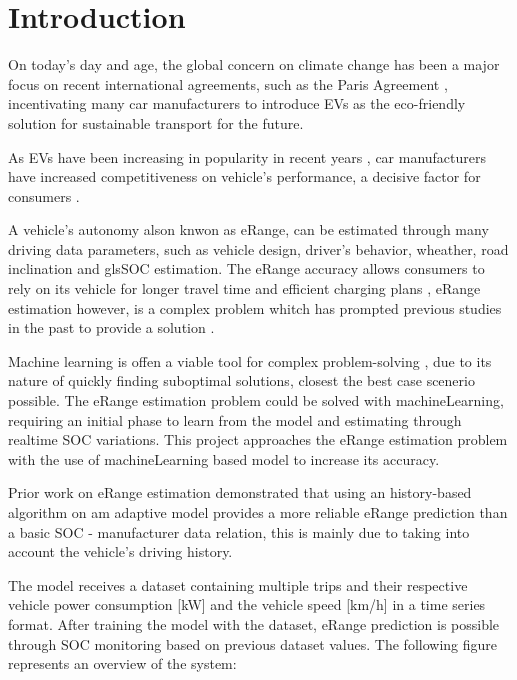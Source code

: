 \chapter{Introduction}
\label{cha:introduction}

On today's day and age, the global concern on climate
change has been a major focus on recent international agreements,
such as the Paris Agreement \cite{parisAgreement},
incentivating many car manufacturers to introduce
\gls{EVs} as the eco-friendly
solution for sustainable transport for the future.


As \gls{EVs} have been increasing in popularity in
recent years , car manufacturers have
increased competitiveness on vehicle's performance,
a decisive factor for consumers \cite{EGBUE2012717}.


A vehicle's autonomy alson knwon as \gls{eRange},
can be estimated through many driving data parameters,
such as vehicle design, driver's behavior, wheather,
road inclination and gls{SOC} estimation.
The \gls{eRange} accuracy allows consumers to rely
on its vehicle for longer travel time and efficient
charging plans , \gls{eRange} estimation
however, is a complex problem whitch has prompted
previous studies in the past to provide a solution 
\cite{classicEVX, predictionOfeRange}.

Machine learning is offen a viable tool for complex
problem-solving , due to its nature
of quickly finding suboptimal solutions,
closest the best case scenerio possible.
The \gls{eRange} estimation problem could be solved
with \gls{machineLearning}, requiring an initial
phase to learn from the model and estimating
through realtime \gls{SOC} variations.
This project approaches the \gls{eRange} estimation
problem with the use of \gls{machineLearning} based
model to increase its accuracy.

Prior work \cite{classicEVX} on \gls{eRange}
estimation demonstrated that using an
history-based algorithm on am adaptive model
provides a more reliable \gls{eRange} prediction
than a basic \gls{SOC} - manufacturer data relation,
this is mainly due to taking into account the
vehicle's driving history.

The model receives a \gls{dataset} containing multiple
trips and their respective vehicle power consumption [kW]
and the vehicle speed [km/h] in a  time series format.
After training the model with the dataset,
\gls{eRange} prediction is possible through
\gls{SOC} monitoring based on previous \gls{dataset} values.
The following figure represents an overview of the system:

